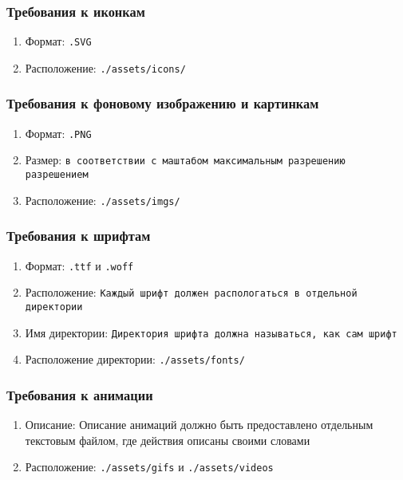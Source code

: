 \subsubsection{Требования к иконкам}
\begin{enumerate}
  \item Формат: \texttt{.SVG}
  \item Расположение: \texttt{./assets/icons/}
\end{enumerate}

\subsubsection{Требования к фоновому изображению и картинкам}
\begin{enumerate}
  \item Формат: \texttt{.PNG}
  \item Размер: \texttt{в соответствии с маштабом максимальным разрешению разрешением}
  \item Расположение: \texttt{./assets/imgs/}
\end{enumerate}

\subsubsection{Требования к шрифтам}
\begin{enumerate}
  \item Формат: \texttt{.ttf} и \texttt{.woff}
  \item Расположение: \texttt{Каждый шрифт должен распологаться в отдельной директории}
  \item Имя директории: \texttt{Директория шрифта должна называться, как сам шрифт}
  \item Расположение директории: \texttt{./assets/fonts/}
\end{enumerate}

\subsubsection{Требования к анимации}
\begin{enumerate}
  \item Описание: Описание анимаций должно быть предоставлено отдельным текстовым файлом, где действия описаны своими словами
  \item Расположение: \texttt{./assets/gifs} и \texttt{./assets/videos}
\end{enumerate}

